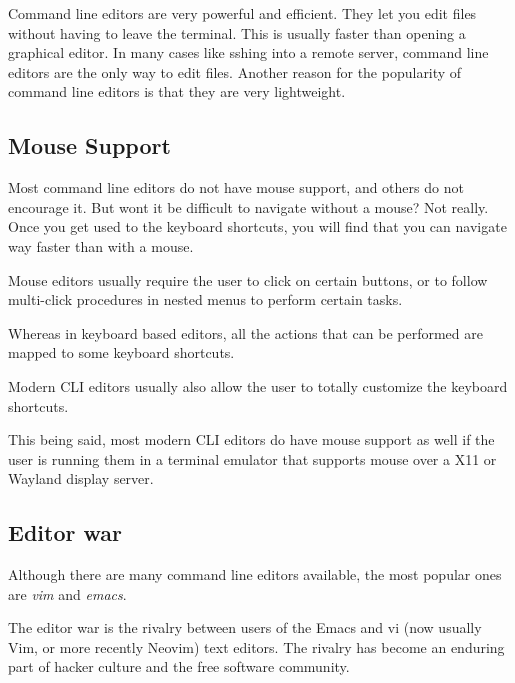 Command line editors are very powerful and efficient.
They let you edit files without having to leave the terminal.
This is usually faster than opening a graphical editor.
In many cases like sshing
into a remote server, command line editors are the only way to edit files.
Another reason for the popularity of command line editors is that they are very lightweight.

\subsection{Mouse Support}
Most command line editors do not have mouse support, and others do not encourage it.
But wont it be difficult to navigate without a mouse?
Not really.
Once you get used to the keyboard shortcuts, you will find that you can navigate way faster than with a mouse.

Mouse editors usually require the user to click on certain buttons,
or to follow multi-click procedures in nested menus to perform certain tasks.

Whereas in keyboard based editors, all the actions that can be performed
are mapped to some keyboard shortcuts.

Modern CLI editors usually also allow the user to totally customize the keyboard shortcuts.

This being said, most modern CLI editors do have mouse support as well if the user is running them in a terminal emulator that supports mouse over a X11 or Wayland display server.

\subsection{Editor war}

Although there are many command line editors available, the most popular ones are \textit{vim} and \textit{emacs}.

\begin{definition}
The editor war is the rivalry between users of the Emacs and vi (now usually Vim, or more recently Neovim) text editors.
The rivalry has become an enduring part of hacker culture and the free software community.
\end{definition}


